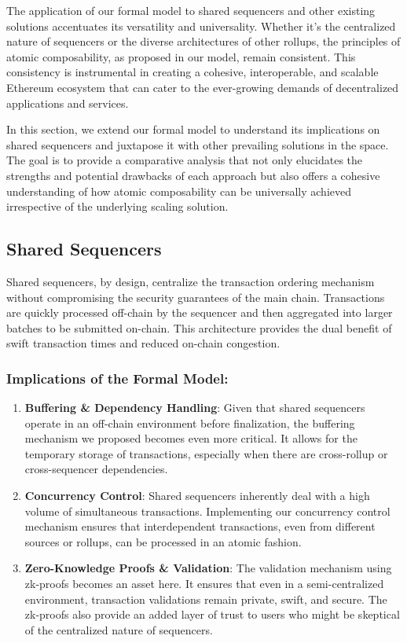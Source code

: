 \documentclass{article}
\begin{document}
The application of our formal model to shared sequencers and other
existing solutions accentuates its versatility and universality. Whether
it's the centralized nature of sequencers or the diverse architectures
of other rollups, the principles of atomic composability, as proposed in
our model, remain consistent. This consistency is instrumental in
creating a cohesive, interoperable, and scalable Ethereum ecosystem that
can cater to the ever-growing demands of decentralized applications and
services.

In this section, we extend our formal model to understand its
implications on shared sequencers and juxtapose it with other prevailing
solutions in the space. The goal is to provide a comparative analysis
that not only elucidates the strengths and potential drawbacks of each
approach but also offers a cohesive understanding of how atomic
composability can be universally achieved irrespective of the underlying
scaling solution.

\subsection{Shared Sequencers}\label{shared-sequencers-a-brief-overview}

Shared sequencers, by design, centralize the transaction ordering
mechanism without compromising the security guarantees of the main
chain. Transactions are quickly processed off-chain by the sequencer and
then aggregated into larger batches to be submitted on-chain. This
architecture provides the dual benefit of swift transaction times and
reduced on-chain congestion.

\subsubsection{Implications of the Formal Model:}\label{applying-the-formal-model}

\begin{enumerate}
\def\labelenumi{\arabic{enumi}.}
\item
  \textbf{Buffering \& Dependency Handling}: Given that shared
  sequencers operate in an off-chain environment before finalization,
  the buffering mechanism we proposed becomes even more critical. It
  allows for the temporary storage of transactions, especially when
  there are cross-rollup or cross-sequencer dependencies.
\item
  \textbf{Concurrency Control}: Shared sequencers inherently deal with a
  high volume of simultaneous transactions. Implementing our concurrency
  control mechanism ensures that interdependent transactions, even from
  different sources or rollups, can be processed in an atomic fashion.
\item
  \textbf{Zero-Knowledge Proofs \& Validation}: The validation mechanism
  using zk-proofs becomes an asset here. It ensures that even in a
  semi-centralized environment, transaction validations remain private,
  swift, and secure. The zk-proofs also provide an added layer of trust
  to users who might be skeptical of the centralized nature of
  sequencers.
\end{enumerate}
\end{document}
